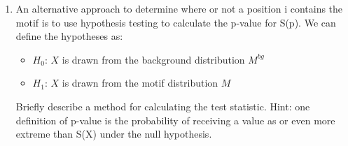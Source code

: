 \begin{enumerate}
One method of determining if a position is included in the motif is to use a decision rule. For example, we could use : '$X$ is a true instance of $M$ if $LLR(X)$ > 0, or equivalently, if $\mathcal S(X) > 0$'.
Is this a statistically sound approach? Why or why not?

\begin{solution}

\end{solution}

\item An alternative approach to determine where or not a position i contains the motif is to use hypothesis testing to calculate the p-value for S(p). We can define the hypotheses as:
\begin{itemize}
    \item $H_0$: $X$ is drawn from the background distribution $M^{bg}$
    \item $H_1$: $X$ is drawn from the motif distribution $M$ 
\end{itemize}
Briefly describe a method for calculating the test statistic. Hint: one definition of p-value is the probability of receiving a value as or even more extreme than S(X) under the null hypothesis. 

\begin{solution}

\end{solution}

\end{enumerate}

